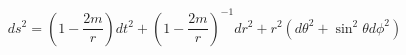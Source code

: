 \begin{equation}
ds^2=\left(1-\frac{2m}{r}\right)
dt^{2}+\left(1-\frac{2m}{r}\right)^{-1}dr^{2}+r^{2}(d\theta^{2}+\sin^{2}\theta
d\phi^{2}) \label{Sch}
\end{equation}

